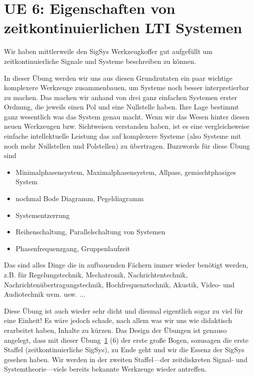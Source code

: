 \clearpage
\section{UE 6: Eigenschaften von zeitkontinuierlichen LTI Systemen}
\label{sec:ue6_lti_ct_eigenschaften}

Wir haben mittlerweile den SigSys Werkzeugkoffer gut aufgefüllt um
zeitkontinuierliche Signale und Systeme beschreiben zu können.

In dieser Übung werden wir uns aus diesen Grundzutaten ein paar wichtige
komplexere Werkzeuge zusammenbauen, um Systeme noch besser interpretierbar zu
machen. Das machen wir anhand von drei ganz einfachen Systemen erster Ordnung,
die jeweils einen Pol und eine Nullstelle haben. Ihre Lage bestimmt ganz wesentlich
was das System genau macht. Wenn wir das Wesen hinter diesen neuen Werkzeugen
bzw. Sichtweisen verstanden haben, ist es eine vergleichsweise einfache
intellektuelle Leistung das auf komplexere Systeme (also Systeme mit noch mehr Nullstellen
und Polstellen) zu übertragen.
%
Buzzwords für diese Übung sind
\begin{itemize}
  \item Minimalphasensystem, Maximalphasensystem, Allpass, gemischtphasiges System
  \item nochmal Bode Diagramm, Pegeldiagramm
  \item Systementzerrung
  \item Reihenschaltung, Parallelschaltung von Systemen
  \item Phasenfrequenzgang, Gruppenlaufzeit
\end{itemize}
Das sind alles Dinge die in aufbauenden Fächern immer wieder benötigt
werden, z.B. für Regelungstechnik, Mechatronik, Nachrichtentechnik,
Nachrichtenübertragungstechnik, Hochfrequenztechnik, Akustik,
Video- und Audiotechnik uvm. usw. ...

Diese Übung ist auch wieder sehr dicht und diesmal eigentlich sogar zu viel für
eine Einheit! Es wäre jedoch schade, nach allem was wir uns wie didaktisch
erarbeitet haben, Inhalte zu kürzen. Das Design der Übungen
ist genauso angelegt, dass mit dieser Übung~\ref{sec:ue6_lti_ct_eigenschaften} (6) der erste große Bogen,
sozusagen die erste Staffel (zeitkontinuierliche SigSys),
zu Ende geht und wir die Essenz der SigSys gesehen haben.
Wir werden in der zweiten Staffel---der zeitdiskreten Signal- und Systemtheorie---viele
bereits bekannte Werkzeuge wieder antreffen.

